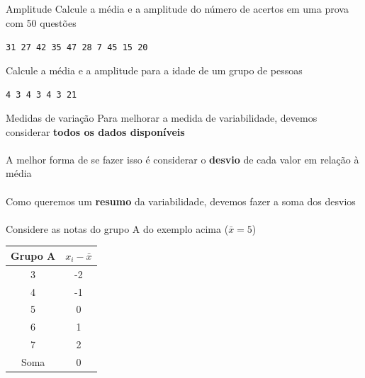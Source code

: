 \documentclass[10pt]{beamer}\usepackage[]{graphicx}\usepackage[]{color}
\theoremstyle{definition}
\begin{document}
\begin{frame}{Amplitude}
  Calcule a média e a amplitude do número de acertos em uma prova com 50
  questões
  \begin{center}
    \texttt{31 27 42 35 47 28 7 45 15 20}
  \end{center}
  \vspace{1em}
  Calcule a média e a amplitude para a idade de um grupo de pessoas
  \begin{center}
    \texttt{4 3 4 3 4 3 21}
  \end{center}
\end{frame}

\begin{frame}{Medidas de variação}
  Para melhorar a medida de variabilidade, devemos considerar
  \textbf{todos os dados disponíveis} \\~\\
  A melhor forma de se fazer isso é considerar o \textbf{desvio} de cada
  valor em relação à média \\~\\
  Como queremos um \textbf{resumo} da variabilidade, devemos fazer a
  soma dos desvios \\~\\
  Considere as notas do grupo A do exemplo acima ($\bar{x} = 5$)
    \begin{table}[htbp]
    \centering
    \begin{tabular}{cc}
      \hline
      \textbf{Grupo A} & $x_i - \bar{x}$ \\ \hline
      3 & -2 \\
      4 & -1\\
      5 & 0\\
      6 & 1\\
      7 & 2\\
      \hline
      Soma & 0 \\
      \hline
    \end{tabular}
  \end{table}
\end{frame}
\end{document}
